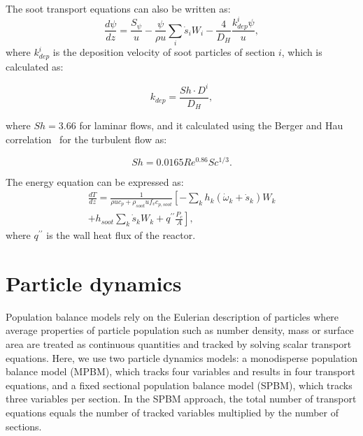  The soot transport equations can also be written as:
\begin{equation}
	\frac{d \psi}{d z}=
	\frac{S_{\psi}}{u}
	-\frac{\psi}{\rho u}\sum_i \dot{s}_i W_i
	-\frac{4}{D_H}\frac{k^i_{dep}\psi}{u},
	\label{eqn:sootpfr}
\end{equation}
\noindent where $k^i_{dep}$ is the deposition velocity of soot particles of section $i$, which is calculated as:

\begin{equation}
	k_{dep}=
	\frac{Sh\cdot D^i}{D_H},
	\label{eqn:kdep}
\end{equation}

\noindent where $Sh=3.66$ for laminar flows, and it calculated using the Berger and Hau correlation~\citep{berger1977mass} for the turbulent flow as:

\begin{equation}
	Sh=
	0.0165Re^{0.86} Sc^{1/3}
	\label{eqn:shdep}.
\end{equation}

The energy equation can be expressed as:
\begin{equation}
	\begin{split}
		\frac{d T}{d z}=
		\frac{1}{\rho u c_p+\rho_{soot} u f_v 	c_{p,soot}}
		\left[
			-\sum_k h_k
			\left(
			\dot{\omega}_k+\dot{s}_k
			\right) W_k
		\right. \\
		\left.
			+h_{soot}\sum_k \dot{s}_k W_k
			+q^{\prime \prime}\frac{P_c}{A}
		\right],
	\end{split}
	\label{eqn:energypfr}
\end{equation}
\noindent where $q^{\prime \prime}$ is the wall heat flux of the reactor.



\section{Particle dynamics}
\label{sec:particledynamics}
Population balance models rely on the Eulerian description of particles where average properties of particle population such as number density, mass or surface area are treated as continuous quantities and tracked by solving scalar transport equations. Here, we use two particle dynamics models: a monodisperse population balance model (MPBM), which tracks four variables and results in four transport equations, and a fixed sectional population balance model (SPBM), which tracks three variables per section. In the SPBM approach, the total number of transport equations equals the number of tracked variables multiplied by the number of sections. 

